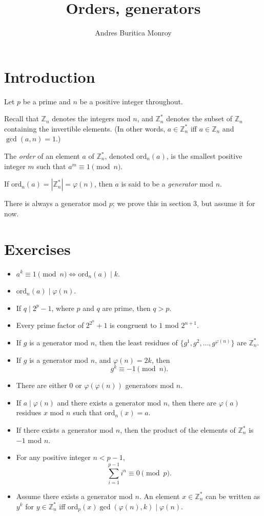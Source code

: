 \documentclass{article}
\title{Orders, generators}
\author{Andres Buritica Monroy}
\date{}
\newcommand\Zz{\mathbb{Z}}
\newcommand\ord{\mathrm{ord}}
\begin{document}
\maketitle
\section{Introduction}
Let $p$ be a prime and $n$ be a positive integer throughout.

Recall that $\Zz_n$ denotes the integers mod $n$, and $\Zz_n^*$ denotes the
subset of $\Zz_n$ containing the invertible elements. (In other words,
$a\in\Zz_n^*$ iff $a\in\Zz_n$ and $\gcd(a,n)=1$.)

The \emph{order} of an element $a$ of $\Zz_n^*$, denoted $\ord_n(a)$,
is the smallest positive integer $m$ such that $a^m\equiv 1\pmod n$.

If $\ord_n(a)=|\mathbb Z_n^*|=\varphi(n)$, then $a$ is said to be a
\emph{generator} mod $n$.

There is always a generator mod $p$; we prove this in section 3, but assume it for
now.
\section{Exercises}
\begin{itemize}
	\item $a^k\equiv 1\pmod n \iff \ord_n(a)\mid k$.
	\item $\ord_n(a)\mid\varphi(n)$.
	\item If $q\mid 2^p-1$, where $p$ and $q$ are prime, then $q>p$.
	\item Every prime factor of $2^{2^n}+1$ is congruent to $1$ mod $2^{n+1}$.
	\item If $g$ is a generator mod $n$, then the least residues of
	      $\{g^1,g^2,\ldots,g^{\varphi(n)}\}$ are $\Zz_n^*$.
	\item If $g$ is a generator mod $n$, and $\varphi(n)=2k$, then
	      \[g^k\equiv -1\pmod n.\]
	\item There are either $0$ or $\varphi(\varphi(n))$ generators mod $n$.
	\item If $a\mid\varphi(n)$ and there exists a generator mod $n$, then
	      there are $\varphi(a)$ residues $x$ mod $n$ such that $\ord_n(x)=a$.
	\item If there exists a generator mod $n$, then the product of the elements of
	      $\Zz_n^*$ is $-1$ mod $n$.
	\item For any positive integer $n<p-1$,
	      \[\sum_{i=1}^{p-1} i^n\equiv 0\pmod p.\]
	\item Assume there exists a generator mod $n$.
	      An element $x\in\Zz_n^*$ can be written as $y^k$ for $y\in\Zz_n^*$ iff
	      $\ord_p(x)\gcd(\varphi(n),k)\mid \varphi(n)$.
\end{itemize}
\end{document}

